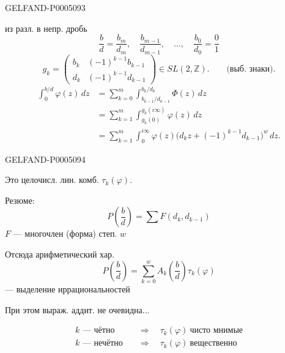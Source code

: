 \begin{GelfandAdjacentEvidence}{GELFAND-P000509}{3}


из разл. в непр. дробь
\[
\frac bd=\frac{b_m}{d_m},\quad\frac{b_{m-1}}{d_{m-1}},\quad
\ldots,\quad\frac{b_0}{d_0}=\frac01
\]
\[
g_k=\begin{pmatrix}
b_k&(-1)^{k-1}b_{k-1}\\
d_k&(-1)^{k-1}d_{k-1}
\end{pmatrix}\in SL(2,\mathbb Z).
\qquad\text{(выб. знаки).}
\]
\[
\begin{aligned}
\int_0^{b/d}\varphi(z)\,dz
&=\sum_{k=0}^m\int_{b_{k-1}/d_{k-1}}^{b_k/d_k}\Phi(z)\,dz\\
&=\sum_{k=1}^m\int_{g_k(0)}^{g_k(i\infty)}\varphi(z)\,dz\\
&=\sum_{k=1}^m\int_0^{i\infty}\varphi(z)
  \bigl(d_kz+(-1)^{k-1}d_{k-1}\bigr)^w\,dz.
\end{aligned}
\]
\end{GelfandAdjacentEvidence}
\begin{GelfandAdjacentEvidence}{GELFAND-P000509}{4}

Это целочисл. лин. комб. $\tau_k(\varphi)$.

Резюме:
\[
P\left(\frac bd\right)=\sum F(d_k,d_{k-1})
\]
$F$ — многочлен (форма) степ. $w$

Отсюда арифметический хар.
\[
P\left(\frac bd\right)=\sum_{k=0}^w A_k\left(\frac bd\right)\tau_k(\varphi)
\]
\hfill — выделение иррациональностей\par

При этом выраж. аддит. не очевидна...
\end{GelfandAdjacentEvidence}


\[
\begin{aligned}
k\text{ — чётно}&\quad\Rightarrow\quad\tau_k(\varphi)\ \text{чисто мнимые}\\
k\text{ — нечётно}&\quad\Rightarrow\quad\tau_k(\varphi)\ \text{вещественно}
\end{aligned}
\]


